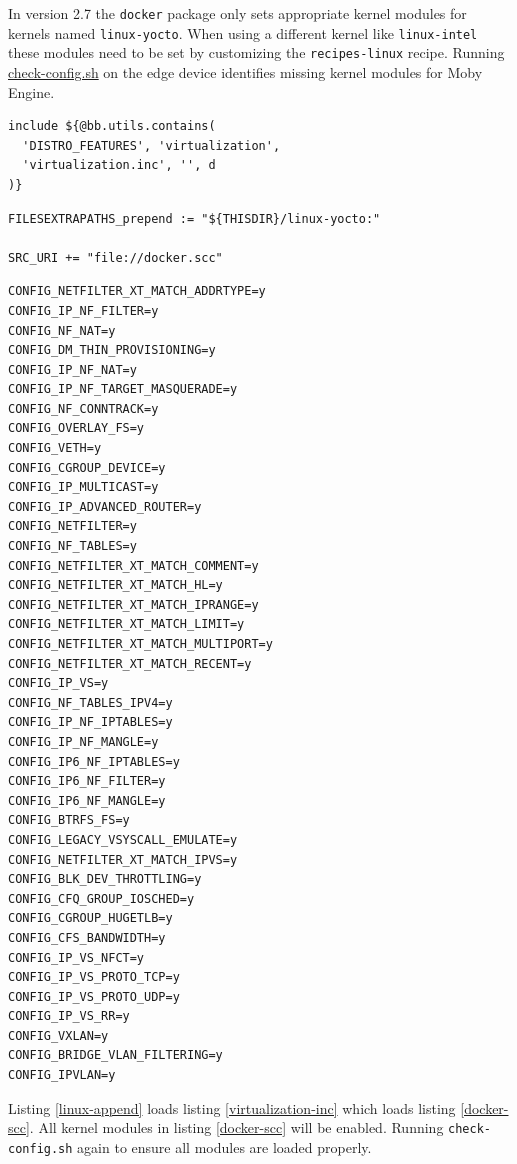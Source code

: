 In version 2.7 the \verb|docker| package only sets appropriate kernel modules for kernels named \verb|linux-yocto|. When using a different kernel like \verb|linux-intel| these modules need to be set by customizing the \verb|recipes-linux| recipe. Running \href{https://raw.githubusercontent.com/moby/moby/master/contrib/check-config.sh}{check-config.sh} on the edge device identifies missing kernel modules for Moby Engine.
\begin{code}
  \label{linux-append}
  \begin{verbatim}
include ${@bb.utils.contains(
  'DISTRO_FEATURES', 'virtualization',
  'virtualization.inc', '', d
)}
  \end{verbatim}
\end{code}
\begin{code}
  \label{virtualization-inc}
  \begin{verbatim}
FILESEXTRAPATHS_prepend := "${THISDIR}/linux-yocto:"

SRC_URI += "file://docker.scc"
  \end{verbatim}
\end{code}
\begin{code}
  \label{docker-scc}
  \begin{verbatim}
CONFIG_NETFILTER_XT_MATCH_ADDRTYPE=y
CONFIG_IP_NF_FILTER=y
CONFIG_NF_NAT=y
CONFIG_DM_THIN_PROVISIONING=y
CONFIG_IP_NF_NAT=y
CONFIG_IP_NF_TARGET_MASQUERADE=y
CONFIG_NF_CONNTRACK=y
CONFIG_OVERLAY_FS=y
CONFIG_VETH=y
CONFIG_CGROUP_DEVICE=y
CONFIG_IP_MULTICAST=y
CONFIG_IP_ADVANCED_ROUTER=y
CONFIG_NETFILTER=y
CONFIG_NF_TABLES=y
CONFIG_NETFILTER_XT_MATCH_COMMENT=y
CONFIG_NETFILTER_XT_MATCH_HL=y
CONFIG_NETFILTER_XT_MATCH_IPRANGE=y
CONFIG_NETFILTER_XT_MATCH_LIMIT=y
CONFIG_NETFILTER_XT_MATCH_MULTIPORT=y
CONFIG_NETFILTER_XT_MATCH_RECENT=y
CONFIG_IP_VS=y
CONFIG_NF_TABLES_IPV4=y
CONFIG_IP_NF_IPTABLES=y
CONFIG_IP_NF_MANGLE=y
CONFIG_IP6_NF_IPTABLES=y
CONFIG_IP6_NF_FILTER=y
CONFIG_IP6_NF_MANGLE=y
CONFIG_BTRFS_FS=y
CONFIG_LEGACY_VSYSCALL_EMULATE=y
CONFIG_NETFILTER_XT_MATCH_IPVS=y
CONFIG_BLK_DEV_THROTTLING=y
CONFIG_CFQ_GROUP_IOSCHED=y
CONFIG_CGROUP_HUGETLB=y
CONFIG_CFS_BANDWIDTH=y
CONFIG_IP_VS_NFCT=y
CONFIG_IP_VS_PROTO_TCP=y
CONFIG_IP_VS_PROTO_UDP=y
CONFIG_IP_VS_RR=y
CONFIG_VXLAN=y
CONFIG_BRIDGE_VLAN_FILTERING=y
CONFIG_IPVLAN=y
  \end{verbatim}
\end{code}
Listing \ref{linux-append} loads listing \ref{virtualization-inc} which loads listing \ref{docker-scc}. All kernel modules in listing \ref{docker-scc} will be enabled. Running \verb|check-config.sh| again to ensure all modules are loaded properly.\\
